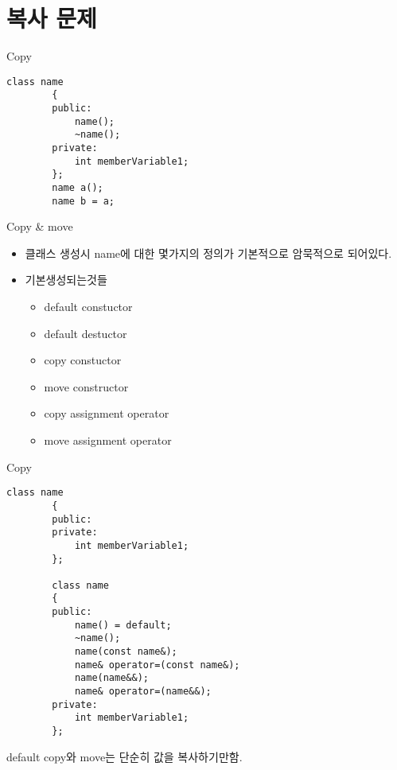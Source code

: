 \documentclass[10pt]{beamer}
\begin{document}
\section{복사 문제}

\begin{frame}[fragile]{Copy}
    \begin{lstlisting}[style = CStyle]
        class name
        {
        public:
            name();
            ~name();
        private:
            int memberVariable1;
        };
        name a();
        name b = a; 
        \end{lstlisting}
\end{frame}    


\begin{frame}{Copy \& move}
    \begin{itemize}
        \item 클래스 생성시 name에 대한 몇가지의 정의가 기본적으로 암묵적으로 되어있다.
        \item 기본생성되는것들
        \begin{itemize}
            \item default constuctor
            \item default destuctor
            \item copy constuctor 
            \item move constructor
            \item copy assignment operator
            \item move assignment operator
        \end{itemize}
    \end{itemize}
\end{frame}    


\begin{frame}[fragile]{Copy}
    \begin{lstlisting}[style = CStyle]
        class name
        {
        public:
        private:
            int memberVariable1;
        };

        class name
        {
        public:
            name() = default;
            ~name();
            name(const name&);
            name& operator=(const name&);
            name(name&&);
            name& operator=(name&&);
        private:
            int memberVariable1;
        };
        \end{lstlisting}
        default copy와 move는 단순히 값을 복사하기만함.
\end{frame}
\end{document}
